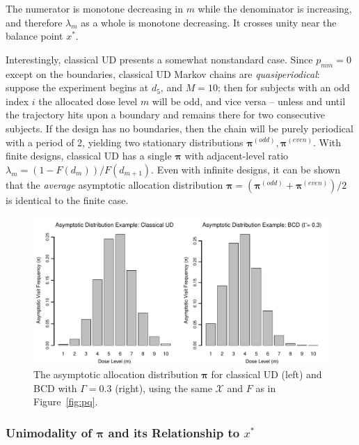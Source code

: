 \noindent The numerator is monotone decreasing in $m$ while the denominator is increasing, and therefore $\lambda_m$ as a whole is monotone decreasing. It crosses unity near the balance point $x^*$.

Interestingly, classical UD presents a somewhat nonstandard case. Since $p_{mm}=0$ except on the boundaries, classical UD Markov chains are \emph{quasiperiodical}: suppose the experiment begins at $d_5$, and $M=10$; then for subjects with an odd index $i$ the allocated dose level $m$ will be odd, and vice versa -- unless and until the trajectory hits upon a boundary and remains there for two consecutive subjects. If the design has no boundaries, then the chain will be purely periodical with a period of 2, yielding two stationary distributions $\boldsymbol{\pi}^{(odd)},\boldsymbol{\pi}^{(even)}$. With finite designs, classical UD has a single $\boldsymbol{\pi}$ with adjacent-level ratio $\lambda_m=\left(1-F(d_m)\right)/F(d_{m+1})$. Even with infinite designs, it can be shown that the \emph{average} asymptotic allocation distribution $\boldsymbol{\pi}=\left(\boldsymbol{\pi}^{(odd)}+\boldsymbol{\pi}^{(even)}\right)/2\ \ $  is identical to the finite case.

\begin{figure}
\begin{center}
\includegraphics[scale=0.55]{pifig}
\caption{The asymptotic allocation distribution $\boldsymbol{\pi}$ for classical UD (left) and BCD with $\Gamma=0.3$ (right), using the same $\mathcal{X}$ and $F$ as in Figure~\ref{fig:pq}.}\label{fig:pi}
\end{center}
\end{figure}


\subsubsection{Unimodality of $\boldsymbol{\pi}$ and its Relationship to $x^*$}\label{sec:modeloc}

